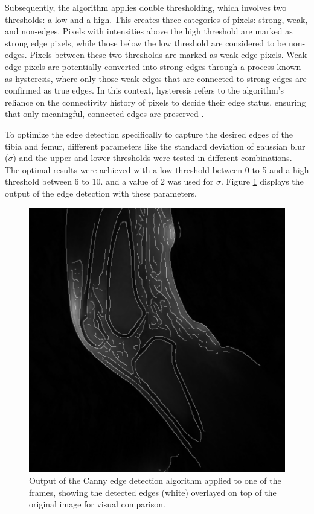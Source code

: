 \documentclass{micro-econ-thesis}
\begin{document}
Subsequently, the algorithm applies double thresholding, which involves two thresholds: a low and a high. This creates three categories of pixels: strong, weak, and non-edges. Pixels with intensities above the high threshold are marked as strong edge pixels, while those below the low threshold are considered to be non-edges. Pixels between these two thresholds are marked as weak edge pixels. Weak edge pixels are potentially converted into strong edges through a process known as hysteresis, where only those weak edges that are connected to strong edges are confirmed as true edges. In this context, hysteresis refers to the algorithm's reliance on the connectivity history of pixels to decide their edge status, ensuring that only meaningful, connected edges are preserved \parencite{heath_robust_1997}.  

To optimize the edge detection specifically to capture the desired edges of the tibia and femur, different parameters like the standard deviation of gaussian blur ($\sigma$) and the upper and lower thresholds were tested in different combinations. The optimal results were achieved with a low threshold between 0 to 5 and a high threshold between 6 to 10. and a value of 2 was used for $\sigma$. Figure \ref{fig:edgemitimg} displays the output of the edge detection with these parameters.  
\begin{figure}[H]
	\centering
	\includegraphics[width=0.7\linewidth]{edge_new}
	\caption{Output of the Canny edge detection algorithm applied to one of the frames, showing the detected edges (white) overlayed on top of the original image for visual comparison.}
	\label{fig:edgemitimg}
\end{figure}
\end{document}
